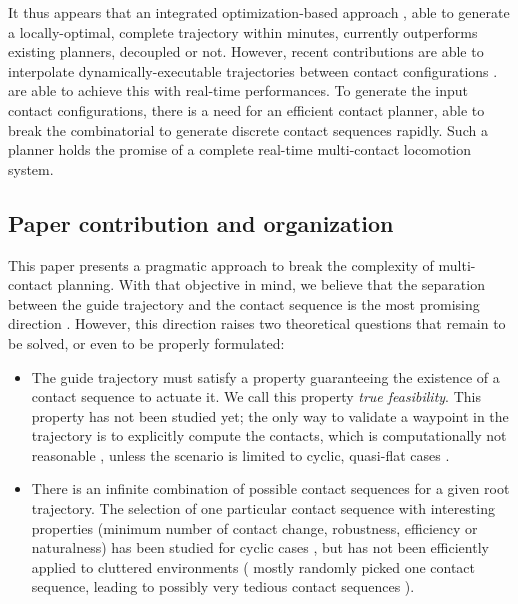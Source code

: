 It thus appears that an integrated optimization-based approach \citep{Mordatch:2012:DCB:2185520.2185539}, able to generate a locally-optimal, complete trajectory within minutes, currently outperforms
existing planners, decoupled or not. However, recent contributions are able to interpolate dynamically-executable 
trajectories between contact configurations \citep{herzog2015trajectory, Carpentier2016}. \citeauthor{Carpentier2016} are able to achieve this with real-time performances.
To generate the input contact configurations, there is a need for an efficient contact planner, able to break the combinatorial to generate discrete contact sequences rapidly. 
Such a planner holds the promise of a complete real-time multi-contact locomotion system.

\subsection{Paper contribution and organization}
This paper presents a pragmatic approach to break the complexity of multi-contact planning. With that objective in mind,
we believe that the separation between the  guide trajectory and the contact sequence is the most promising direction \citep{DBLP:conf/iser/EscandeKMG08}.
However, this direction raises two theoretical questions that remain to be solved, or even to be properly formulated:
\begin{itemize}
\item The guide trajectory must satisfy a property guaranteeing  the existence of a contact sequence to actuate it. We call this property \textit{true feasibility}. This property has not been studied yet; the only way to validate a waypoint in the trajectory is to explicitly compute the contacts, which is computationally not reasonable \citep{Bouyarmane2009}, unless the scenario is limited to cyclic, quasi-flat cases \citep{zucker2010optimization}.
\item There is an infinite combination  of possible contact sequences for a given root trajectory. The selection of one particular contact sequence with interesting properties (minimum number of contact change, robustness, efficiency or naturalness) has been studied for cyclic cases \citep{Hauser06usingmotion}, but has not been efficiently applied to cluttered environments (\citeauthor{bouyarmane:lirmm-00777727, DBLP:conf/iser/EscandeKMG08} mostly randomly picked one contact sequence, leading to possibly very tedious contact sequences ).
\end{itemize}

